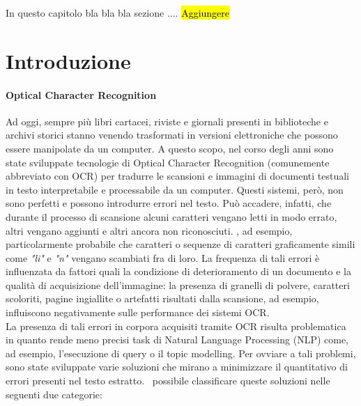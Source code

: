 In questo capitolo bla bla bla sezione .... \hl{Aggiungere}

\section{Introduzione}
\label{sec:arte_intro}
\paragraph{Optical Character Recognition}
Ad oggi, sempre più libri cartacei, riviste e giornali presenti in biblioteche e archivi storici stanno venendo trasformati in versioni elettroniche che possono essere manipolate da un computer. A questo scopo, nel corso degli anni sono state sviluppate tecnologie di Optical Character Recognition (comunemente abbreviato con OCR) per tradurre le scansioni e immagini di documenti testuali in testo interpretabile e processabile da un computer. Questi sistemi, però, non sono perfetti e possono introdurre errori nel testo. Può accadere, infatti, che durante il processo di scansione alcuni caratteri vengano letti in modo errato, altri vengano aggiunti e altri ancora non riconosciuti. \E, ad esempio, particolarmente probabile che caratteri o sequenze di caratteri graficamente simili come \textit{"li"} e \textit{"n"} vengano scambiati fra di loro\cite{ocr_error_analysis}. La frequenza di tali errori è influenzata da fattori quali la condizione di deterioramento di un documento e la qualità di acquisizione dell'immagine\cite{hartley1999quality}: la presenza di granelli di polvere, caratteri scoloriti, pagine ingiallite o artefatti risultati dalla scansione, ad esempio, influiscono negativamente sulle performance dei sistemi OCR.\\
La presenza di tali errori in corpora acquisiti tramite OCR risulta problematica in quanto rende meno precisi task di Natural Language Processing (NLP) come, ad esempio, l'esecuzione di query \cite{impatto_ocr_1} o il topic modelling\cite{impatto_ocr_2}. Per ovviare a tali problemi, sono state sviluppate varie soluzioni che mirano a minimizzare il quantitativo di errori presenti nel testo estratto. \E\ possibile classificare queste soluzioni nelle seguenti due categorie:
